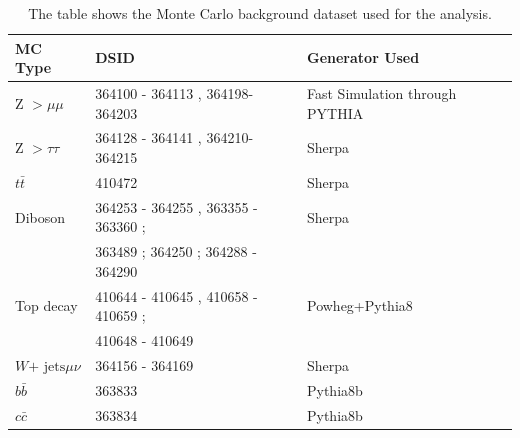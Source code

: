 \begin{table}[!htb]
    \begin{center}
    \caption{
        The table shows the Monte Carlo background dataset used for the analysis. 
    \label{table:MC}
    }
\label{tab:MC samples}
\begin{tabular}{|l|l|l|}
\hline
\textbf{MC Type}   & \textbf{DSID}                                                         &\textbf{Generator Used}\\ \hline
Z $> \mu\mu$   & 364100 - 364113 , 364198-364203                                       &Fast Simulation through PYTHIA\\ \hline
Z $> \tau \tau$ & 364128 - 364141 , 364210-364215                                       &Sherpa\\ \hline
$t\bar{t}$         & 410472                                                                &Sherpa\\ \hline
Diboson            & 364253 - 364255 , 363355 - 363360 ; &Sherpa \\
& 363489 ; 364250 ; 364288 - 364290 & \\ \hline
Top decay          & 410644 - 410645 , 410658 - 410659 ;                   &Powheg+Pythia8\\ 
&410648 - 410649 & \\ \hline
$W \textrm{+ jets} \mu\nu$  & 364156 - 364169                                                       &Sherpa\\ \hline
$b\bar{b}$         & 363833                                                                &Pythia8b\\ \hline
$c\bar{c}$         & 363834                                                                &Pythia8b\\ \hline
\end{tabular}
\end{center}
\end{table}

